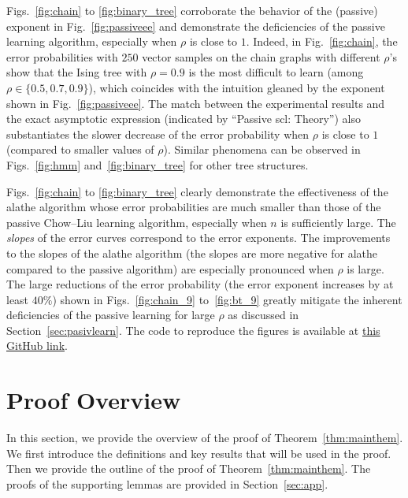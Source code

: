 \documentclass[11pt,onecolumn]{article}
\begin{document}
Figs.~\ref{fig:chain} to \ref{fig:binary_tree} corroborate the behavior of the (passive) exponent in Fig.~\ref{fig:passiveee} and demonstrate the deficiencies of the passive learning algorithm, especially when $\rho $ is close to $1$. Indeed, in Fig.~\ref{fig:chain}, the error probabilities with $250$ vector samples on the chain graphs with different $\rho$'s show that the Ising tree with $\rho=0.9$ is the most difficult to learn (among $\rho \in \{0.5, 0.7, 0.9\}$), which coincides with the intuition gleaned by the exponent shown in Fig.~\ref{fig:passiveee}. The match between the experimental results and the exact asymptotic expression (indicated by ``Passive \ac{scl}: Theory'') also substantiates the slower decrease of the error probability when $\rho$ is close to $1$ (compared to smaller values of $\rho$). Similar phenomena can be observed in Figs.~\ref{fig:hmm} and~\ref{fig:binary_tree} for other tree structures.

Figs.~\ref{fig:chain} to \ref{fig:binary_tree} clearly demonstrate the effectiveness of the \ac{alathe} algorithm whose error probabilities are much smaller than those of the passive Chow--Liu learning algorithm, especially when $n$ is sufficiently large. %
The {\em slopes} of the error curves correspond to the error exponents.  
The improvements to  the slopes   of the \ac{alathe} algorithm  (the slopes are more negative for \ac{alathe} compared to the passive algorithm) are especially pronounced when $\rho$ is large. %
The large reductions of the error probability (the error exponent increases by at least $40\%$) shown in Figs.~\ref{fig:chain_9} to~\ref{fig:bt_9} greatly mitigate the inherent deficiencies of the passive learning for large $\rho$ as discussed in Section~\ref{sec:pasivlearn}. The code to reproduce the figures is available at  \textcolor{blue}{\href{https://github.com/Zhang-Fengzhuo/Active-LATHE}{this  GitHub link}}.

\section{Proof Overview}\label{sec:pfview}
In this section, we provide the overview of the proof of Theorem~\ref{thm:mainthem}. We first introduce the definitions and key results that will be used in the proof. Then we provide the outline of the proof of Theorem~\ref{thm:mainthem}. The proofs of the supporting lemmas are provided in Section~\ref{sec:app}.
\end{document}
